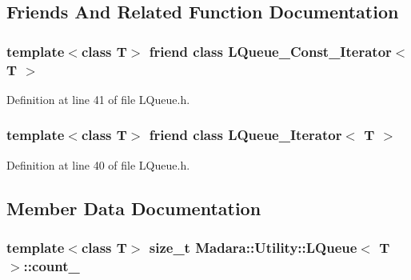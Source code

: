 \subsection{Friends And Related Function Documentation}
\hypertarget{classMadara_1_1Utility_1_1LQueue_a5375c049d93ee611e2c8b38c64dd16a8}{
\subsubsection[{LQueue\_\-Const\_\-Iterator$<$ T $>$}]{\setlength{\rightskip}{0pt plus 5cm}template$<$class T$>$ friend class {\bf LQueue\_\-Const\_\-Iterator}$<$ T $>$}}
\label{d7/df8/classMadara_1_1Utility_1_1LQueue_a5375c049d93ee611e2c8b38c64dd16a8}


Definition at line 41 of file LQueue.h.

\hypertarget{classMadara_1_1Utility_1_1LQueue_a6b7cc6b02ab011daa89db3ab25c2d1c5}{
\subsubsection[{LQueue\_\-Iterator$<$ T $>$}]{\setlength{\rightskip}{0pt plus 5cm}template$<$class T$>$ friend class {\bf LQueue\_\-Iterator}$<$ T $>$}}
\label{d7/df8/classMadara_1_1Utility_1_1LQueue_a6b7cc6b02ab011daa89db3ab25c2d1c5}


Definition at line 40 of file LQueue.h.



\subsection{Member Data Documentation}
\hypertarget{classMadara_1_1Utility_1_1LQueue_a02709c963731b73e3a762928751a29c9}{
\subsubsection[{count\_\-}]{\setlength{\rightskip}{0pt plus 5cm}template$<$class T$>$ size\_\-t {\bf Madara::Utility::LQueue}$<$ T $>$::{\bf count\_\-}}}
\label{d7/df8/classMadara_1_1Utility_1_1LQueue_a02709c963731b73e3a762928751a29c9}


